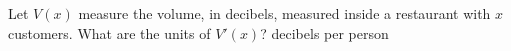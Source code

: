 {Let $V(x)$ measure the volume, in decibels, measured inside a restaurant with $x$ customers. What are the units of $V'(x)$?
}
{decibels per person
}
